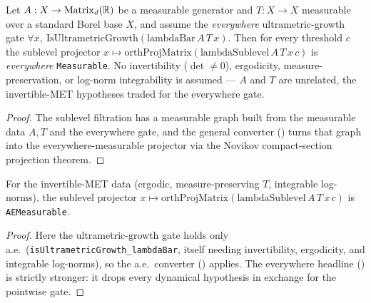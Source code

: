 \begin{theorem}\label{thm:dst-headline}
  \leanok
  Let \(A:X\to\operatorname{Matrix}_d(\mathbb{R})\) be a measurable generator and \(T:X\to X\) measurable over a standard
  Borel base \(X\), and assume the \emph{everywhere} ultrametric-growth gate
  \(\forall x,\ \mathrm{IsUltrametricGrowth}(\mathrm{lambdaBar}\,A\,T\,x)\). Then for every
  threshold \(c\) the sublevel projector \(x\mapsto\mathrm{orthProjMatrix}(\mathrm{lambdaSublevel}\,
  A\,T\,x\,c)\) is \emph{everywhere} \texttt{Measurable}. No invertibility (\(\det\neq 0\)),
  ergodicity, measure-preservation, or log-norm integrability is assumed --- \(A\) and \(T\) are
  unrelated, the invertible-MET hypotheses traded for the everywhere gate.
\end{theorem}
\begin{proof}\leanok
  The sublevel filtration has a measurable graph
  built from the measurable data \(A,T\) and the everywhere gate, and the general converter
  () turns that graph into the everywhere-measurable projector
  via the Novikov compact-section projection theorem.
\end{proof}

\begin{theorem}\label{thm:dst-aemeasurable}
  \leanok
  For the invertible-MET data (ergodic, measure-preserving \(T\), integrable log-norms), the
  sublevel projector \(x\mapsto\mathrm{orthProjMatrix}(\mathrm{lambdaSublevel}\,A\,T\,x\,c)\) is
  \texttt{AEMeasurable}.
\end{theorem}
\begin{proof}\leanok
  Here the ultrametric-growth gate holds only a.e.\ (\texttt{isUltrametricGrowth\_lambdaBar},
  itself needing invertibility, ergodicity, and integrable log-norms), so the a.e.\ converter
  () applies. The everywhere headline
  () is strictly stronger: it drops every dynamical hypothesis in exchange
  for the pointwise gate.
\end{proof}

